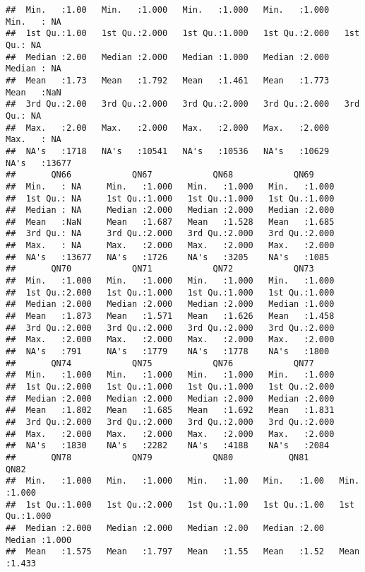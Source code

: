 \documentclass[
]{article}
\begin{document}
\begin{verbatim}
##  Min.   :1.00   Min.   :1.000   Min.   :1.000   Min.   :1.000   Min.   : NA    
##  1st Qu.:1.00   1st Qu.:2.000   1st Qu.:1.000   1st Qu.:2.000   1st Qu.: NA    
##  Median :2.00   Median :2.000   Median :1.000   Median :2.000   Median : NA    
##  Mean   :1.73   Mean   :1.792   Mean   :1.461   Mean   :1.773   Mean   :NaN    
##  3rd Qu.:2.00   3rd Qu.:2.000   3rd Qu.:2.000   3rd Qu.:2.000   3rd Qu.: NA    
##  Max.   :2.00   Max.   :2.000   Max.   :2.000   Max.   :2.000   Max.   : NA    
##  NA's   :1718   NA's   :10541   NA's   :10536   NA's   :10629   NA's   :13677  
##       QN66            QN67            QN68            QN69      
##  Min.   : NA     Min.   :1.000   Min.   :1.000   Min.   :1.000  
##  1st Qu.: NA     1st Qu.:1.000   1st Qu.:1.000   1st Qu.:1.000  
##  Median : NA     Median :2.000   Median :2.000   Median :2.000  
##  Mean   :NaN     Mean   :1.687   Mean   :1.528   Mean   :1.685  
##  3rd Qu.: NA     3rd Qu.:2.000   3rd Qu.:2.000   3rd Qu.:2.000  
##  Max.   : NA     Max.   :2.000   Max.   :2.000   Max.   :2.000  
##  NA's   :13677   NA's   :1726    NA's   :3205    NA's   :1085   
##       QN70            QN71            QN72            QN73      
##  Min.   :1.000   Min.   :1.000   Min.   :1.000   Min.   :1.000  
##  1st Qu.:2.000   1st Qu.:1.000   1st Qu.:1.000   1st Qu.:1.000  
##  Median :2.000   Median :2.000   Median :2.000   Median :1.000  
##  Mean   :1.873   Mean   :1.571   Mean   :1.626   Mean   :1.458  
##  3rd Qu.:2.000   3rd Qu.:2.000   3rd Qu.:2.000   3rd Qu.:2.000  
##  Max.   :2.000   Max.   :2.000   Max.   :2.000   Max.   :2.000  
##  NA's   :791     NA's   :1779    NA's   :1778    NA's   :1800   
##       QN74            QN75            QN76            QN77      
##  Min.   :1.000   Min.   :1.000   Min.   :1.000   Min.   :1.000  
##  1st Qu.:2.000   1st Qu.:1.000   1st Qu.:1.000   1st Qu.:2.000  
##  Median :2.000   Median :2.000   Median :2.000   Median :2.000  
##  Mean   :1.802   Mean   :1.685   Mean   :1.692   Mean   :1.831  
##  3rd Qu.:2.000   3rd Qu.:2.000   3rd Qu.:2.000   3rd Qu.:2.000  
##  Max.   :2.000   Max.   :2.000   Max.   :2.000   Max.   :2.000  
##  NA's   :1830    NA's   :2282    NA's   :4188    NA's   :2084   
##       QN78            QN79            QN80           QN81           QN82      
##  Min.   :1.000   Min.   :1.000   Min.   :1.00   Min.   :1.00   Min.   :1.000  
##  1st Qu.:1.000   1st Qu.:2.000   1st Qu.:1.00   1st Qu.:1.00   1st Qu.:1.000  
##  Median :2.000   Median :2.000   Median :2.00   Median :2.00   Median :1.000  
##  Mean   :1.575   Mean   :1.797   Mean   :1.55   Mean   :1.52   Mean   :1.433  

\end{verbatim}
\end{document}

